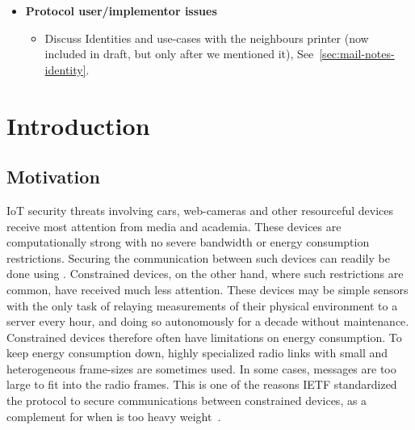 \documentclass[runningheads]{llncs}
\begin{document}
{\begin{itemize}
\begin{itemize}
\begin{itemize}
                \item Discuss Transcipt hashes that lag behind one message and that
                it is supposed to "cover as much as possible", but sometimes
                does not (check tamarin model also for inconsistencies between
                methods). Unclear design except "as much as possible".
                \end{itemize}
            \item{\textbf{Protocol user/implementor issues}}
                \begin{itemize}
                \item Discuss Identities and use-cases with the neighbours printer
                (now included in draft, but only after we mentioned it),
                See~\ref{sec:mail-notes-identity}.
                \end{itemize}
        \end{itemize}
\end{itemize}
}

\section{Introduction}
\label{sec:introduction}
\subsection{Motivation}
\label{sec:motivation}
IoT security threats involving cars, web-cameras and other resourceful devices
receive most attention from media and academia.
%
These devices are computationally strong with no severe bandwidth or energy
consumption restrictions.
%
Securing the communication between such devices can readily be done using
\mDandTls.
%
Constrained devices, on the other hand, where such restrictions are common,
have received much less attention.
%
These devices may be simple sensors with the only task of relaying
measurements of their physical environment to a server every hour, and doing so
autonomously for a decade without maintenance.
%
Constrained devices therefore often have limitations on energy consumption.
%
To keep energy consumption down, highly specialized radio links with small
and heterogeneous frame-sizes are sometimes used.
%
In some cases, \mDandTls messages are too large to fit into the radio frames.
%
This is one of the reasons IETF standardized the \mOscore protocol to secure
communications between constrained devices, as a complement for when \mDandTls
is too heavy weight~\cite{rfc8613}.
%
\end{document}

